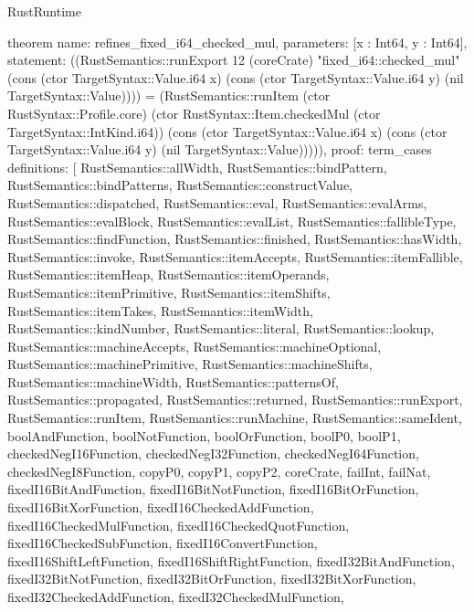 \begin{lexlean}{RustRuntime}
\begin{semanticmodule}
theorem{
  name: refines_fixed_i64_checked_mul,
  parameters: [x : Int64, y : Int64],
  statement: ((RustSemantics::runExport 12 (coreCrate) "fixed_i64::checked_mul" (cons (ctor TargetSyntax::Value.i64 x) (cons (ctor TargetSyntax::Value.i64 y) (nil TargetSyntax::Value)))) = (RustSemantics::runItem (ctor RustSyntax::Profile.core) (ctor RustSyntax::Item.checkedMul (ctor TargetSyntax::IntKind.i64)) (cons (ctor TargetSyntax::Value.i64 x) (cons (ctor TargetSyntax::Value.i64 y) (nil TargetSyntax::Value))))),
  proof: term_cases{
    definitions: [
      RustSemantics::allWidth,
      RustSemantics::bindPattern,
      RustSemantics::bindPatterns,
      RustSemantics::constructValue,
      RustSemantics::dispatched,
      RustSemantics::eval,
      RustSemantics::evalArms,
      RustSemantics::evalBlock,
      RustSemantics::evalList,
      RustSemantics::fallibleType,
      RustSemantics::findFunction,
      RustSemantics::finished,
      RustSemantics::hasWidth,
      RustSemantics::invoke,
      RustSemantics::itemAccepts,
      RustSemantics::itemFallible,
      RustSemantics::itemHeap,
      RustSemantics::itemOperands,
      RustSemantics::itemPrimitive,
      RustSemantics::itemShifts,
      RustSemantics::itemTakes,
      RustSemantics::itemWidth,
      RustSemantics::kindNumber,
      RustSemantics::literal,
      RustSemantics::lookup,
      RustSemantics::machineAccepts,
      RustSemantics::machineOptional,
      RustSemantics::machinePrimitive,
      RustSemantics::machineShifts,
      RustSemantics::machineWidth,
      RustSemantics::patternsOf,
      RustSemantics::propagated,
      RustSemantics::returned,
      RustSemantics::runExport,
      RustSemantics::runItem,
      RustSemantics::runMachine,
      RustSemantics::sameIdent,
      boolAndFunction,
      boolNotFunction,
      boolOrFunction,
      boolP0,
      boolP1,
      checkedNegI16Function,
      checkedNegI32Function,
      checkedNegI64Function,
      checkedNegI8Function,
      copyP0,
      copyP1,
      copyP2,
      coreCrate,
      failInt,
      failNat,
      fixedI16BitAndFunction,
      fixedI16BitNotFunction,
      fixedI16BitOrFunction,
      fixedI16BitXorFunction,
      fixedI16CheckedAddFunction,
      fixedI16CheckedMulFunction,
      fixedI16CheckedQuotFunction,
      fixedI16CheckedSubFunction,
      fixedI16ConvertFunction,
      fixedI16ShiftLeftFunction,
      fixedI16ShiftRightFunction,
      fixedI32BitAndFunction,
      fixedI32BitNotFunction,
      fixedI32BitOrFunction,
      fixedI32BitXorFunction,
      fixedI32CheckedAddFunction,
      fixedI32CheckedMulFunction,
}}
\end{semanticmodule}
\end{lexlean}
